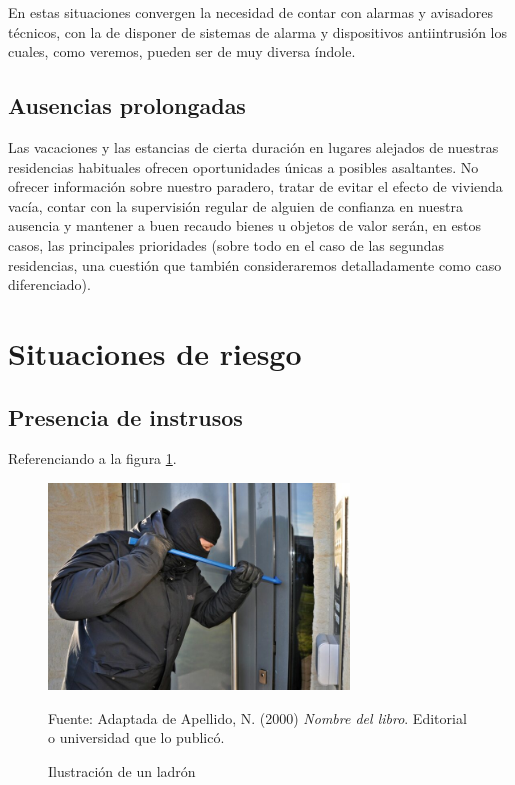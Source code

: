 En estas situaciones convergen la necesidad de contar con alarmas y avisadores técnicos, con la de disponer de sistemas de alarma y dispositivos antiintrusión los cuales, como veremos, pueden ser de muy diversa índole.\\

\subsection{Ausencias prolongadas}
Las vacaciones y las estancias de cierta duración en lugares alejados de nuestras residencias habituales ofrecen oportunidades únicas a posibles asaltantes. No ofrecer información sobre nuestro paradero, tratar de evitar el efecto de vivienda vacía, contar con la supervisión regular de alguien de confianza en nuestra ausencia y mantener a buen recaudo bienes u objetos de valor serán, en estos casos, las principales prioridades (sobre todo en el caso de las segundas residencias, una cuestión que también consideraremos detalladamente como caso diferenciado).\\

\section{Situaciones de riesgo}
\subsection{Presencia de instrusos}

Referenciando a la figura \ref{fig:ejemplo}.
\begin{figure}[H]
    \begin{center}
        \includegraphics[width=8cm]{img/capitulo_2/burglar.jpg}
    \end{center}
    \caption{Ilustración de un ladrón}
    Fuente: Adaptada de Apellido, N. (2000) \textit{Nombre del libro}.
    Editorial o universidad que lo publicó.
    \label{fig:ejemplo}
\end{figure}

